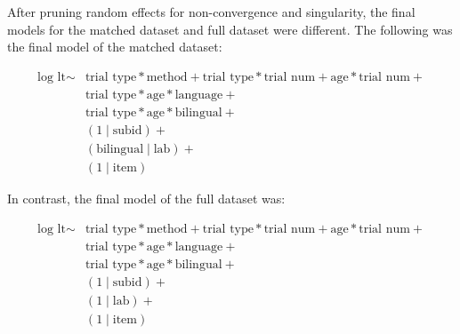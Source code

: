 \documentclass[english,,man,floatsintext]{apa6}
\begin{document}
After pruning random effects for non-convergence and singularity, the final models for the matched dataset and full dataset were different. The following was the final model of the matched dataset:

\begin{equation}
\begin{split}
\text{log lt} \sim & \text{trial type} * \text{method} + \text{trial type} * \text{trial num} + \text{age} * \text{trial num} + \\
& \text{trial type} * \text{age} * \text{language} + \\
& \text{trial type} * \text{age} * \text{bilingual} + \\
& (1 \mid \text{subid}) + \\
& (\text{bilingual} \mid \text{lab}) + \\
& (1 \mid \text{item})
\end{split}
\end{equation}

In contrast, the final model of the full dataset was:

\begin{equation}
\begin{split}
\text{log lt} \sim & \text{trial type} * \text{method} + \text{trial type} * \text{trial num} + \text{age} * \text{trial num} + \\
& \text{trial type} * \text{age} * \text{language} + \\
& \text{trial type} * \text{age} * \text{bilingual} + \\
& (1 \mid \text{subid}) + \\
& (1 \mid \text{lab}) + \\
& (1 \mid \text{item})
\end{split}
\end{equation}
\end{document}
